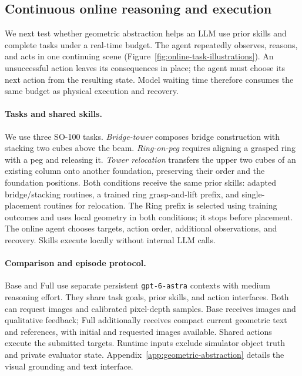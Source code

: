 \subsection{Continuous online reasoning and execution}
\label{sec:online-experiments}

We next test whether geometric abstraction helps an LLM use prior skills and
complete tasks under a real-time budget. The agent repeatedly observes, reasons,
and acts in one continuing scene (Figure~\ref{fig:online-task-illustrations}).
An unsuccessful action leaves its consequences in place; the agent must choose
its next action from the resulting state. Model waiting time therefore consumes
the same budget as physical execution and recovery.

\paragraph{Tasks and shared skills.}
We use three SO-100 tasks. \emph{Bridge-tower} composes bridge construction with
stacking two cubes above the beam. \emph{Ring-on-peg} requires aligning a grasped
ring with a peg and releasing it. \emph{Tower relocation} transfers the upper
two cubes of an existing column onto another foundation, preserving their order
and the foundation positions. Both conditions receive the same prior skills:
adapted bridge/stacking routines, a trained ring grasp-and-lift prefix, and
single-placement routines for relocation. The Ring prefix is selected using
training outcomes and uses local geometry in both conditions; it stops before
placement. The online agent chooses targets, action order, additional observations,
and recovery. Skills execute locally without internal LLM calls.

\paragraph{Comparison and episode protocol.}
Base and Full use separate persistent \texttt{gpt-6-astra} contexts with medium
reasoning effort. They share task goals, prior skills, and action interfaces.
Both can request images and calibrated pixel-depth samples. Base receives images
and qualitative feedback; Full additionally receives compact current geometric
text and references, with initial and requested images available. Shared actions
execute the submitted targets. Runtime inputs exclude simulator object truth and
private evaluator state. Appendix~\ref{app:geometric-abstraction} details the
visual grounding and text interface.

